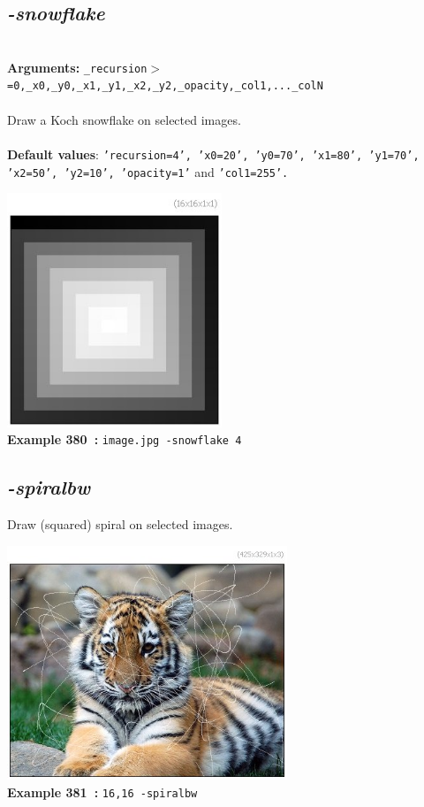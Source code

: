 \documentclass[a4paper,11pt,twoside]{book}
\begin{document}
\subsection{\emph{-snowflake} }\vspace*{-0.5em}
~\\\textbf{Arguments: } 
{\small \texttt{\_recursion$>$=0,\_x0,\_y0,\_x1,\_y1,\_x2,\_y2,\_opacity,\_col1,...\_colN}}\\~\\
Draw a Koch snowflake on selected images.
~\\~\\\textbf{Default values}: {\small \texttt{'recursion=4', 'x0=20', 'y0=70', 'x1=80', 'y1=70', 'x2=50', 'y2=10', 'opacity=1'} and \texttt{'col1=255'.}}
\begin{center}\includegraphics[keepaspectratio=true,height=7cm,width=\textwidth]{img/gmic_def380.jpg}\\
{\footnotesize \textbf{Example 380~:} \texttt{image.jpg -snowflake 4}}
\end{center}

\subsection{\emph{-spiralbw} }\vspace*{-0.5em}
Draw (squared) spiral on selected images.
\begin{center}\includegraphics[keepaspectratio=true,height=7cm,width=\textwidth]{img/gmic_def381.jpg}\\
{\footnotesize \textbf{Example 381~:} \texttt{16,16 -spiralbw}}
\end{center}
\end{document}
